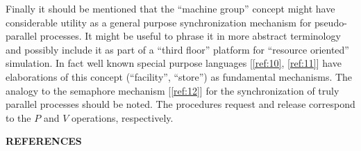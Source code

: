 Finally it should be mentioned that the ``machine group'' concept might have considerable utility as a general purpose synchronization mechanism for pseudo-parallel processes. It might be useful to phrase it in more abstract terminology and possibly include it as part of a ``third floor'' platform for ``resource oriented'' simulation. In fact well known special purpose languages [\ref{ref:10}, \ref{ref:11}] have elaborations of this concept (``facility'', ``store'') as fundamental mechanisms. The analogy to the semaphore mechanism [\ref{ref:12}] for the synchronization of truly parallel processes should be noted. The procedures request and release correspond to the $P$ and $V$ operations, respectively.

\bigskip

\noindent
\textbf{REFERENCES}
\medskip\nopagebreak


